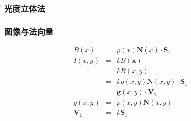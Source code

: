 \documentclass{beamer}
\newcommand{\cdummy}{\cdot}
\newcommand{\nospace}{}
\newcommand{\tmmathbf}[1]{\ensuremath{\boldsymbol{#1}}}
\begin{document}
{{\begin{frame}
\end{frame}

\begin{frame}
  \frametitle{光度立体法}
  
\end{frame}

\begin{frame}
  \frametitle{}
  
  {\hspace{3em}}
\end{frame}

\begin{frame}
  \frametitle{图像与法向量}
  \begin{eqnarray*}
    B (x) & = & \rho (x) \tmmathbf{N} (x) \cdummy \tmmathbf{S}_1\\
    I (x, y) & = & k \nospace B (\tmmathbf{x})\\
    & = & k \nospace B (x, y)\\
    & = & k \rho (x, y) \tmmathbf{N} (x, y) \cdummy \tmmathbf{S}_1\\
    & = & \tmmathbf{g} (x, y) \cdummy \tmmathbf{V}_1\\
    g (x, y) & = & \rho (x, y) \tmmathbf{N} (x, y)\\
    \tmmathbf{V}_1 & = & k\tmmathbf{S}_1
  \end{eqnarray*}
  

\end{frame}}}
\end{document}
